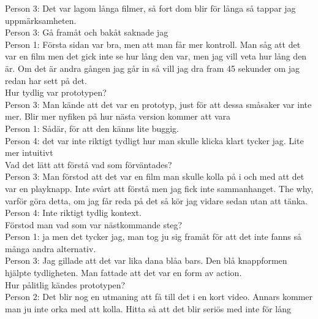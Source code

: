 Person 3: Det var lagom långa filmer, så fort dom blir för långa så tappar jag uppmärksamheten. \\

Person 3: Gå framåt och bakåt saknade jag \\

Person 1: Första sidan var bra, men att man får mer kontroll. Man såg att det var en film men det gick inte se hur lång den var, men jag vill veta hur lång den är. Om det är andra gången jag går in så vill jag dra fram 45 sekunder om jag redan har sett på det. \\

Hur tydlig var prototypen? \\

Person 3: Man kände att det var en prototyp, just för att dessa småsaker var inte mer. Blir mer nyfiken på hur nästa version kommer att vara \\

Person 1: Sådär, för att den känns lite buggig. \\

Person 4: det var inte riktigt tydligt hur man skulle klicka klart tycker jag. Lite mer intuitivt \\

Vad det lätt att förstå vad som förväntades? \\

Person 3: Man förstod att det var en film man skulle kolla på i och med att det var en playknapp. Inte svårt att förstå men jag fick inte sammanhanget. The why, varför göra detta, om jag får reda på det så kör jag vidare sedan utan att tänka.\\

Person 4: Inte riktigt tydlig kontext. \\

Förstod man vad som var nästkommande steg?\\

Person 1: ja men det tycker jag, man tog ju sig framåt för att det inte fanns så många andra alternativ. \\

Person 3: Jag gillade att det var lika dana blåa bars. Den blå knappformen hjälpte tydligheten. Man fattade att det var en form av action. \\ 

Hur pålitlig kändes prototypen?\\

Person 2: Det blir nog en utmaning att få till det i en kort video. Annars kommer man ju inte orka med att kolla. Hitta så att det blir seriös med inte för lång \\

